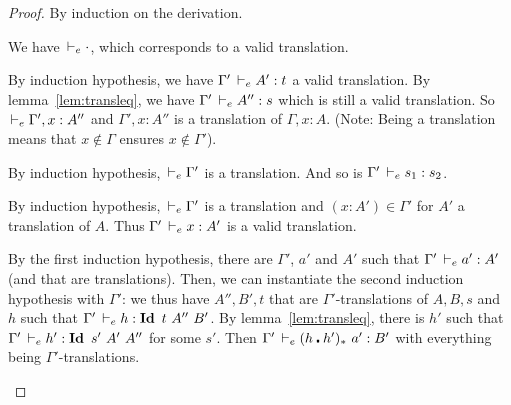 \documentclass[a4paper,english]{lipics-utf8x}
\begin{document}
  \begin{proof}
    By induction on the derivation.

    \leavevmode
    \begin{caselist}
      \begin{graycase}
        \begin{mathc}
          \ru{}{\derr \cdot}
        \end{mathc}
        We have $\,\vdash_e \cdot$, which corresponds to a valid translation.
      \end{graycase}

      \begin{graycase}
        \begin{mathc}
        \end{mathc}
        By induction hypothesis, we have $\Gamma' \,\vdash_e A' : t$ a valid
        translation. By lemma~\ref{lem:transleq}, we have
        $\Gamma' \,\vdash_e A'' : s$ which is still a valid translation.
        So $\,\vdash_e \Gamma', x : A''$ and $\Gamma', x : A''$ is a translation of
        $\Gamma, x : A$.
        (Note: Being a translation means that $x \notin \Gamma$ ensures
        $x \notin \Gamma'$).
      \end{graycase}

      \begin{graycase}
        \begin{mathc}
        \end{mathc}
        By induction hypothesis, $\,\vdash_e \Gamma'$ is a translation.
        And so is $\Gamma' \,\vdash_e s_1 : s_2$.
      \end{graycase}

      \begin{graycase}
        \begin{mathc}
        \end{mathc}
        By induction hypothesis, $\,\vdash_e \Gamma'$ is a translation and
        $(x : A') \in \Gamma'$ for $A'$ a translation of $A$.
        Thus $\Gamma' \,\vdash_e x : A'$ is a valid translation.
      \end{graycase}

      \nextcase
      \begin{mathc}
      \end{mathc}
      By the first induction hypothesis, there are $\Gamma'$, $a'$ and $A'$
      such that $\Gamma' \,\vdash_e a' : A'$ (and that are translations).
      Then, we can instantiate the second induction hypothesis with $\Gamma'$:
      we thus have $A'',B',t$ that are $\Gamma'$-translations of $A,B,s$ and
      $h$ such that $\Gamma' \dere h : \Id t\ A''\ B'$.
      By lemma~\ref{lem:transleq}, there is $h'$ such that
      $\Gamma' \dere h' : \Id s'\ A'\ A''$ for some $s'$.
      Then $\Gamma' \,\vdash_e (h \centerdot h')_*\ a' : B'$ with everything being
      $\Gamma'$-translations.


\end{caselist}
\end{proof}
\end{document}
